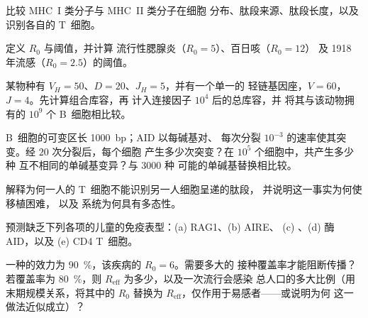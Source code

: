 \begin{exercise}[$\star$]\label{exo:b3:adaptive-immunity:3}
比较 MHC~I 类分子与 MHC~II 类分子在细胞
分布、肽段来源、肽段长度，以及识别各自的 T~细胞。
\end{exercise}

\begin{exercise}[$\star$]\label{exo:b3:adaptive-immunity:4}
定义 $R_{0}$ 与阈值，并计算
流行性腮腺炎（$R_{0} = 5$）、百日咳（$R_{0} = 12$）
及 1918 年流感（$R_{0} = 2.5$）的阈值。
\end{exercise}

\begin{exercise}[$\star\star$]\label{exo:b3:adaptive-immunity:5}
某物种有 $V_{H} = 50$、$D = 20$、$J_{H} = 5$，并有一个单一的
轻链基因座，$V = 60$，$J = 4$。先计算组合库容，再
计入连接因子 $10^{4}$ 后的总库容，并
将其与该动物拥有的 $10^{9}$ 个 B~细胞相比较。
\end{exercise}

\begin{exercise}[$\star\star$]\label{exo:b3:adaptive-immunity:6}
 B~细胞的可变区长 \qty{1000}{bp}；AID 以每碱基对、
每次分裂 $10^{-3}$ 的速率使其突变。经 $20$ 次分裂后，每个细胞
产生多少次突变？在 $10^{5}$ 个细胞中，共产生多少种
互不相同的单碱基变异？与 $3000$ 种
可能的单碱基替换相比较。
\end{exercise}

\begin{exercise}[$\star\star$]\label{exo:b3:adaptive-immunity:7}
解释为何一人的 T~细胞不能识别另一人细胞呈递的肽段，
并说明这一事实为何使移植困难，
以及  系统为何具有多态性。
\end{exercise}

\begin{exercise}[$\star\star$]\label{exo:b3:adaptive-immunity:8}
预测缺乏下列各项的儿童的免疫表型：(a) RAG1、(b) AIRE、
(c) 、(d) 酶 AID，以及 (e) CD4 T~细胞。
\end{exercise}

\begin{exercise}[$\star\star$]\label{exo:b3:adaptive-immunity:9}
一种的效力为 \qty{90}{\%}，该疾病的 $R_{0} = 6$。需要多大的
接种覆盖率才能阻断传播？若覆盖率为 \qty{80}{\%}，则
$R_{\text{eff}}$ 为多少，以及一次流行会感染
总人口的多大比例（用末期规模关系，将其中的 $R_{0}$
替换为 $R_{\text{eff}}$，仅作用于易感者——或说明为何
这一做法近似成立）？
\end{exercise}

